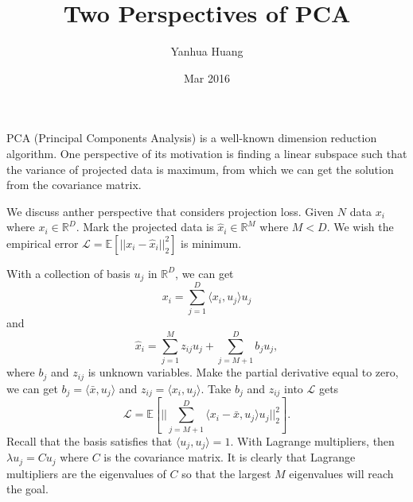 \documentclass[a4paper,11pt]{article}
\begin{document}
\title{Two Perspectives of PCA}
\author{Yanhua Huang}
\date{Mar 2016}
\maketitle

PCA (Principal Components Analysis) is a well-known dimension reduction algorithm. One perspective of its motivation is finding a linear subspace such that the variance of projected data is maximum, from which we can get the solution from the covariance matrix.

We discuss anther perspective that considers projection loss. Given $N$ data $x_i$ where $x_i \in \mathbb{R}^{D}$. Mark the projected data is $\hat{x}_i \in \mathbb{R}^{M}$ where $M < D$. We wish the empirical error $\mathcal{L} = \mathbb{E}[||x_i - \hat{x}_i||_2^2]$ is minimum.

With a collection of basis $u_j$ in $\mathbb{R}^{D}$, we can get 
\begin{equation}
x_i = \sum_{j=1}^{D}{\langle x_i, u_j \rangle u_j}
\end{equation}
and 
\begin{equation}
\hat{x}_i = \sum_{j=1}^M{z_{ij} u_j} + \sum_{j=M+1}^D{b_j u_j},
\end{equation}
where $b_j$ and $z_{ij}$ is unknown variables. Make the partial derivative equal to zero, we can get $b_j = \langle \bar{x}, u_j \rangle$ and $z_{ij} = \langle x_i, u_j \rangle$. Take $b_j$ and $z_{ij}$ into $\mathcal{L}$ gets 
\begin{equation}
\mathcal{L} = \mathbb{E}[||{\sum_{j=M+1}^{D}\langle x_i - \bar{x}, u_j \rangle u_j}||_2^2].
\end{equation}
Recall that the basis satisfies that $\langle u_j, u_j \rangle = 1$. With Lagrange multipliers, then $\lambda u_j = Cu_j$ where $C$ is the covariance matrix. It is clearly that Lagrange multipliers are the eigenvalues of $C$ so that the largest $M$ eigenvalues will reach the goal.
\end{document}
